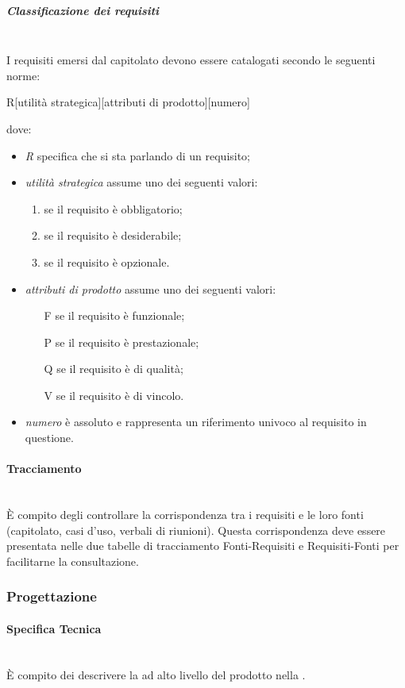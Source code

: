 \subparagraph{Classificazione dei requisiti}\mbox{}\\
I requisiti emersi dal capitolato devono essere catalogati secondo le seguenti norme:
\begin{center}
	R[utilità strategica][attributi di prodotto][numero]
\end{center}
dove:
\begin{itemize}
	\item \textit{R} specifica che si sta parlando di un requisito;
	\item \textit{utilità strategica} assume uno dei seguenti valori:
	\begin{enumerate}
		\item se il requisito è obbligatorio;
		\item se il requisito è desiderabile;
		\item se il requisito è opzionale.
	\end{enumerate}
	\item \textit{attributi di prodotto} assume uno dei seguenti valori:
	\begin{itemize}
		\item [F] se il requisito è funzionale;
		\item [P] se il requisito è prestazionale;
		\item [Q] se il requisito è di qualità;
		\item [V] se il requisito è di vincolo.
	\end{itemize}
	\item \textit{numero} è assoluto e rappresenta un riferimento univoco al requisito in questione.
\end{itemize}

\paragraph{Tracciamento}\mbox{}\\
\`{E} compito degli \Analisti{} controllare la corrispondenza tra i requisiti e le loro fonti (capitolato, casi d'uso, verbali di riunioni). Questa corrispondenza deve essere presentata nelle due tabelle di tracciamento Fonti-Requisiti e Requisiti-Fonti per facilitarne la consultazione. 

\subsubsection{Progettazione}
\paragraph{Specifica Tecnica}\mbox{}\\
\`{E} compito dei \Progettisti{} descrivere la \PA{} ad alto livello del prodotto nella \SpecificaTecnica.

